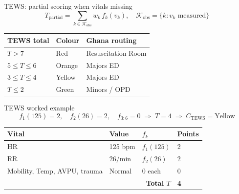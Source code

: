 \begin{frame}{TEWS: partial scoring when vitals missing}
  \begin{equation*}
    T_{\mathrm{partial}} = \sum_{k \in \mathcal{K}_{\mathrm{obs}}} w_k \, f_k(v_k), \quad
    \mathcal{K}_{\mathrm{obs}} = \{k : v_k \text{ measured}\}
  \end{equation*}


  \footnotesize
  \begin{tabular}{@{}lll@{}}
    \toprule
    TEWS total & Colour & Ghana routing \\
    \midrule
    $T > 7$ & Red & Resuscitation Room \\
    $5 \leq T \leq 6$ & Orange & Majors ED \\
    $3 \leq T \leq 4$ & Yellow & Majors ED \\
    $T \leq 2$ & Green & Minors / OPD \\
    \bottomrule
  \end{tabular}
\end{frame}

\begin{frame}{TEWS worked example}
  \begin{equation*}
    f_1(125) = 2,\quad f_2(26) = 2,\quad f_{3:6} = 0
    \;\Rightarrow\; T = 4 \;\Rightarrow\; C_{\mathrm{TEWS}} = \text{Yellow}
  \end{equation*}

  \begin{center}
    \footnotesize
    \begin{tabular}{@{}llll@{}}
      \toprule
      Vital & Value & $f_k$ & Points \\
      \midrule
      HR & 125 bpm & $f_1(125)$ & 2 \\
      RR & 26/min & $f_2(26)$ & 2 \\
      Mobility, Temp, AVPU, trauma & Normal & 0 each & 0 \\
      \midrule
      \multicolumn{3}{r}{\textbf{Total $T$}} & \textbf{4} \\
      \bottomrule
    \end{tabular}
  \end{center}
\end{frame}

